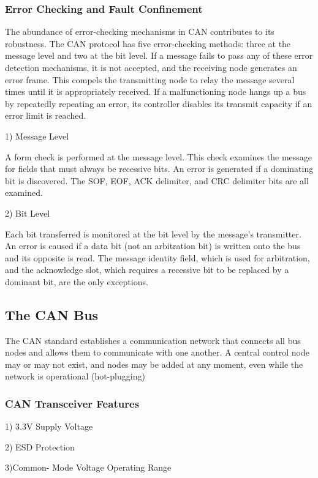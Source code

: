 \subsubsection{Error Checking and Fault Confinement}

The abundance of error-checking mechanisms in CAN contributes to its robustness. The CAN protocol has five error-checking methods: three at the message level and two at the bit level. If a message fails to pass any of these error detection mechanisms, it is not accepted, and the receiving node generates an error frame. This compels the transmitting node to relay the message several times until it is appropriately received. If a malfunctioning node hangs up a bus by repeatedly repeating an error, its controller disables its transmit capacity if an error limit is reached.


1) Message Level


A form check is performed at the message level. This check examines the message for fields that must always be recessive bits. An error is generated if a dominating bit is discovered. The SOF, EOF, ACK delimiter, and CRC delimiter bits are all examined.

2) Bit Level


Each bit transferred is monitored at the bit level by the message's transmitter. An error is caused if a data bit (not an arbitration bit) is written onto the bus and its opposite is read. The message identity field, which is used for arbitration, and the acknowledge slot, which requires a recessive bit to be replaced by a dominant bit, are the only exceptions.

\subsection{The CAN Bus}

The CAN standard establishes a communication network that connects all bus nodes and allows them to communicate with one another. A central control node may or may not exist, and nodes may be added at any moment, even while the network is operational (hot-plugging)

\subsubsection{CAN Transceiver Features}

1) 3.3V Supply Voltage

2) ESD Protection

3)Common- Mode Voltage Operating Range

